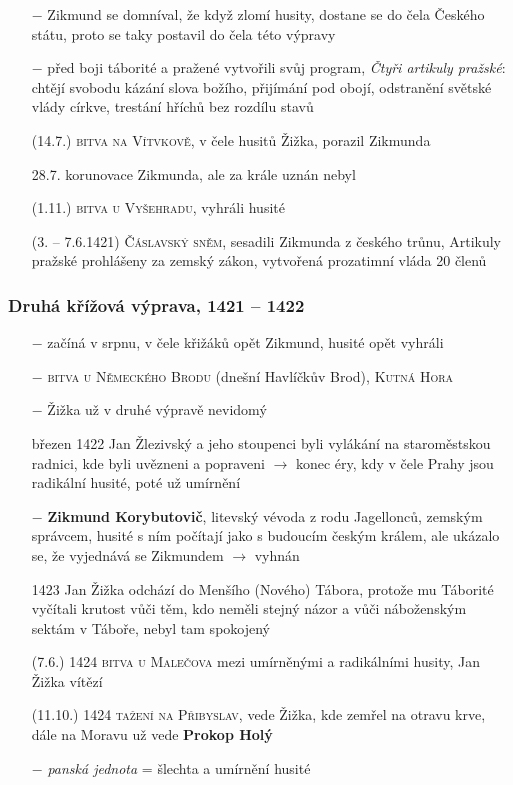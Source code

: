 \documentclass{article}
\begin{document}
\begin{itemize}
    \vspace{-0.5em}
    \setlength\itemsep{0.15em}
    \item[$-$] Zikmund se domníval, že když zlomí husity, dostane se do čela Českého státu, proto se taky postavil do čela této výpravy
    \item[$-$] před boji táborité a pražené vytvořili svůj program, \textit{Čtyři artikuly pražské}: chtějí svobodu kázání slova božího, přijímání pod obojí, odstranění světské vlády církve, trestání hříchů bez rozdílu stavů
    \item[(14.7.)] \textsc{bitva na Vítvkově}, v čele husitů Žižka, porazil Zikmunda
    \item[28.7.] korunovace Zikmunda, ale za krále uznán nebyl
    \item[(1.11.)] \textsc{bitva u Vyšehradu}, vyhráli husité
    \item[(3. -- 7.6.1421)] \textsc{Čáslavský sněm}, sesadili Zikmunda z českého trůnu, Artikuly pražské prohlášeny za zemský zákon, vytvořená prozatimní vláda 20 členů
\end{itemize}

\subsubsection*{Druhá křížová výprava, 1421 -- 1422}
\begin{itemize}
    \vspace{-0.5em}
    \setlength\itemsep{0.15em}
    \item[$-$] začíná v srpnu, v čele křižáků opět Zikmund, husité opět vyhráli
    \item[$-$] \textsc{bitva u Německého Brodu} (dnešní Havlíčkův Brod), \textsc{Kutná Hora}
    \item[$-$] Žižka už v druhé výpravě nevidomý
    \item[březen 1422] Jan Žlezivský a jeho stoupenci byli vylákání na staroměstskou radnici, kde byli uvězneni a popraveni $\rightarrow$ konec éry, kdy v čele Prahy jsou radikální husité, poté už umírnění
    \item[$-$] \textbf{Zikmund Korybutovič}, litevský vévoda z rodu Jagellonců, zemským správcem, husité s ním počítají jako s budoucím českým králem, ale ukázalo se, že vyjednává se Zikmundem $\rightarrow$ vyhnán
    \item[1423] Jan Žižka odchází do Menšího (Nového) Tábora, protože mu Táborité vyčítali krutost vůči těm, kdo neměli stejný názor a vůči náboženským sektám v Táboře, nebyl tam spokojený
    \item[(7.6.) 1424] \textsc{bitva u Malečova} mezi umírněnými a radikálními husity, Jan Žižka vítězí
    \item[(11.10.) 1424] \textsc{tažení na Přibyslav}, vede Žižka, kde zemřel na otravu krve, dále na Moravu už vede \textbf{Prokop Holý}
    \item[$-$] \textit{panská jednota} = šlechta a umírnění husité
\end{itemize}
\end{document}
